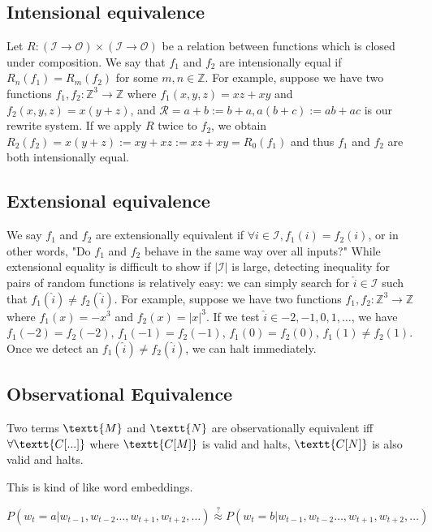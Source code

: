 \documentclass[11pt]{article}
\begin{document}
    \subsection{Intensional equivalence}\label{subsec:intensional-equivalence}

    Let $R: (\mathcal{I} \rightarrow \mathcal{O}) \times (\mathcal{I}\rightarrow \mathcal{O})$ be a relation between functions which is closed under composition. We say that $f_1$ and $f_2$ are intensionally equal if $R_n(f_1)=R_m(f_2)$ for some $m,n \in \mathbb{Z}$. For example, suppose we have two functions $f_1, f_2: \mathbb{Z}^3 \rightarrow \mathbb{Z}$ where $f_1(x, y, z)=xz + xy$ and $f_2(x, y, z)=x(y + z)$, and $\mathcal{R}={a + b := b + a, a(b + c) := ab + ac}$ is our rewrite system. If we apply $R$ twice to $f_2$, we obtain $R_2(f_2)=x(y + z):=xy + xz:=xz + xy=R_0(f_1)$ and thus $f_1$ and $f_2$ are both intensionally equal.

    \subsection{Extensional equivalence}\label{subsec:extensional-equivalence}

    We say $f_1$ and $f_2$ are extensionally equivalent if $\forall i \in \mathcal{I}, f_1(i)=f_2(i)$, or in other words, "Do $f_1$ and $f_2$ behave in the same way over all inputs?" While extensional equality is difficult to show if $|\mathcal{I}|$ is large, detecting inequality for pairs of random functions is relatively easy: we can simply search for $\hat i \in \mathcal{I}$ such that $f_1(\hat i) \neq f_2(\hat i)$. For example, suppose we have two functions $f_1, f_2: \mathbb{Z}^3 \rightarrow \mathbb{Z}$ where $f_1(x)=-x^3$ and $f_2(x)=|x|^3$. If we test $\hat i \in {-2, -1, 0, 1, \ldots}$, we have $f_1(-2)=f_2(-2)$, $f_1(-1)=f_2(-1)$, $f_1(0)=f_2(0)$, $f_1(1) \neq f_2(1)$. Once we detect an $f_1(\hat i) \neq f_2(\hat i)$, we can halt immediately.

    \subsection{Observational Equivalence}

    Two terms $\textt{M}$ and $\textt{N}$ are observationally equivalent iff $\forall \textt{C[...]}$ where $\textt{C[M]}$ is valid and halts, $\textt{C[N]}$ is also valid and halts.

    This is kind of like word embeddings.

    $P(w_t = a | w_{t-1}, w_{t-2}\ldots, w_{t+1}, w_{t+2}, \ldots)\overset{?}{\approx} P(w_t = b | w_{t-1}, w_{t-2}\ldots, w_{t+1}, w_{t+2}, \ldots)$
\end{document}
